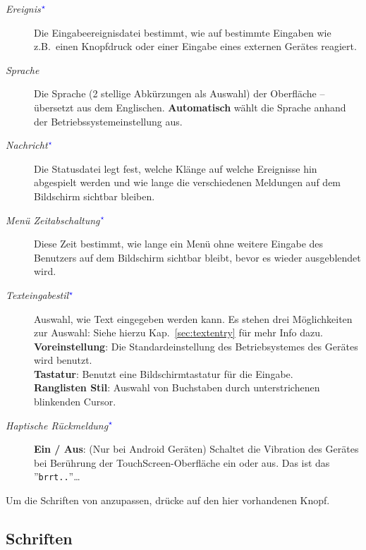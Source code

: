 \begin{description}
\item[\textit{Ereignis$^{\textcolor{blue}{\star}}$}]  Die Eingabeereignisdatei bestimmt, wie \xc auf bestimmte Eingaben wie z.B.\ einen Knopfdruck oder einer
Eingabe eines externen Gerätes reagiert.
\item[\textit{Sprache}]  Die Sprache (2 stellige Abkürzungen als Auswahl) der Oberfläche -- übersetzt aus dem Englischen.
{\bf Automatisch} wählt die Sprache anhand der Betriebssystemeinstellung aus.
\item[\textit{Nachricht$^{\textcolor{blue}{\star}}$}] Die Statusdatei legt fest, welche Klänge auf welche Ereignisse hin abgespielt werden
und wie lange die verschiedenen Meldungen auf dem Bildschirm sichtbar bleiben.
\item[\textit{Menü Zeitabschaltung$^{\textcolor{blue}{\star}}$}] Diese Zeit bestimmt, wie lange ein Menü ohne weitere Eingabe des Benutzers auf
dem Bildschirm sichtbar bleibt, bevor es wieder ausgeblendet wird.
\item[\textit{Texteingabestil$^{\textcolor{blue}{\star}}$}]  Auswahl, wie Text eingegeben werden kann. Es stehen drei Möglichkeiten zur Auswahl:
  Siehe hierzu Kap.~\ref{sec:textentry} für mehr Info dazu. \\
    {\bf Voreinstellung}: Die Standardeinstellung des Betriebsystemes des Gerätes wird benutzt.\\
    {\bf Tastatur}: Benutzt eine Bildschirmtastatur  für die Eingabe.  \\
    {\bf Ranglisten Stil}: Auswahl von Buchstaben durch unterstrichenen blinkenden Cursor.
\item[\textit{Haptische Rückmeldung$^{\textcolor{blue}{\star}}$}]  {\bf Ein / Aus}: (Nur bei Android Geräten) Schaltet die Vibration des Gerätes bei Berührung der TouchScreen-Oberfläche  ein oder aus. Das ist das ''\texttt{brrt..}''\dots
\end{description}



Um die Schriften von \xc anzupassen, drücke auf den hier vorhandenen   Knopf.

\subsection*{Schriften}

